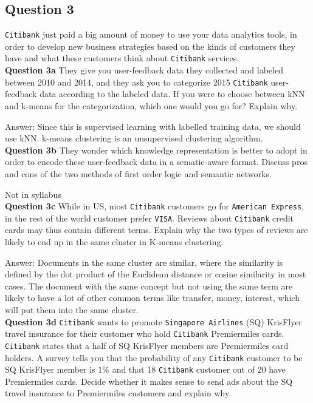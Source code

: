 \documentclass[11pt,a4paper]{report}
\begin{document}
\begin{multicols*}{2}
\section{Question 3}

\verb|Citibank| just paid a big amount of money to use your data analytics tools, in order to develop new business strategies based on the kinds of customers they have and what these customers think about \verb|Citibank| services.\\

\noindent \textbf{Question 3a} They give you user-feedback data they collected and labeled between 2010 and 2014, and they ask you to categorize 2015 \verb|Citibank| user-feedback data according to the labeled data. If you were to choose between kNN and k-means for the categorization, which one would you go for? Explain why. 

\noindent Answer: Since this is supervised learning with labelled training data, we should use kNN. k-means clustering is an unsupervised clustering algorithm. \\

\noindent \textbf{Question 3b} They wonder which knowledge representation is better to adopt in order to encode these user-feedback data in a sematic-aware format. Discuss pros and cons of the two methods of first order logic and semantic networks. 

\noindent Not in syllabus \\

\noindent \textbf{Question 3c} While in US, most \verb|Citibank| customers go for \verb|American Express|, in the rest of the world customer prefer \verb|VISA|. Reviews about \verb|Citibank| credit cards may thus contain different terms. Explain why the two types of reviews are likely to end up in the same cluster in K-means clustering.

\noindent Answer: Documents in the same cluster are similar, where the similarity is defined by the dot product of the Euclidean distance or cosine similarity in most cases. The document with the same concept but not using the same term are likely to have a lot of other common terms like transfer, money, interest, which will put them into the same cluster. \\

\noindent \textbf{Question 3d} \verb|Citibank|  wants to promote \verb|Singapore Airlines| (SQ) KrisFlyer travel insurance for their customer who hold \verb|Citibank| Premiermiles cards. \verb|Citibank| states that a half of SQ KrisFlyer members are Premiermiles card holders. A survey tells you that the probability of any \verb|Citibank| customer to be SQ KrisFlyer member is $1\%$ and that 18 \verb|Citibank| customer out of 20 have Premiermiles cards. Decide whether it makes sense to send ads about the SQ travel insurance to Premiermiles customers and explain why. 


\end{multicols*}
\end{document}
